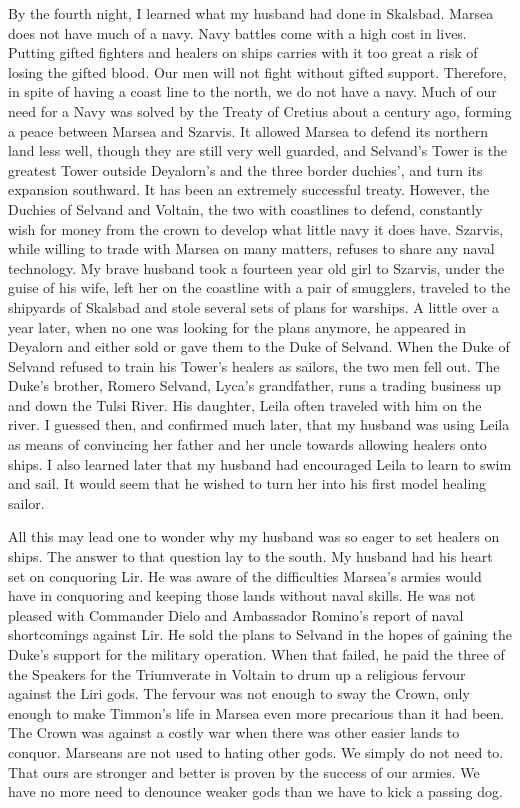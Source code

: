 \documentclass{article}
\begin{document}
By the fourth night, I learned what my husband had done in Skalsbad. Marsea does not have much of a navy. Navy battles come with a high cost in lives. Putting gifted fighters and healers on ships carries with it too great a risk of losing the gifted blood. Our men will not fight without gifted support. Therefore, in spite of having a coast line to the north, we do not have a navy. Much of our need for a Navy was solved by the Treaty of Cretius about a century ago, forming a peace between Marsea and Szarvis. It allowed Marsea to defend its northern land less well, though they are still very well guarded, and Selvand's Tower is the greatest Tower outside Deyalorn's and the three border duchies', and turn its expansion southward. It has been an extremely successful treaty. However, the Duchies of Selvand and Voltain, the two with coastlines to defend, constantly wish for money from the crown to develop what little navy it does have. Szarvis, while willing to trade with Marsea on many matters, refuses to share any naval technology. My brave husband took a fourteen year old girl to Szarvis, under the guise of his wife, left her on the coastline with a pair of smugglers, traveled to the shipyards of Skalsbad and stole several sets of plans for warships. A little over a year later, when no one was looking for the plans anymore, he appeared in Deyalorn and either sold or gave them to the Duke of Selvand. When the Duke of Selvand refused to train his Tower's healers as sailors, the two men fell out. The Duke's brother, Romero Selvand, Lyca's grandfather, runs a trading business up and down the Tulsi River. His daughter, Leila often traveled with him on the river. I guessed then, and confirmed much later, that my husband was using Leila as means of convincing her father and her uncle towards allowing healers onto ships. I also learned later that my husband had encouraged Leila to learn to swim and sail. It would seem that he wished to turn her into his first model healing sailor.

All this may lead one to wonder why my husband was so eager to set healers on ships. The answer to that question lay to the south. My husband had his heart set on conquoring Lir. He was aware of the difficulties Marsea's armies would have in conquoring and keeping those lands without naval skills. He was not pleased with Commander Dielo and Ambassador Romino's report of naval shortcomings against Lir. He sold the plans to Selvand in the hopes of gaining the Duke's support for the military operation. When that failed, he paid the three of the Speakers for the Triumverate in Voltain to drum up a religious fervour against the Liri gods. The fervour was not enough to sway the Crown, only enough to make Timmon's life in Marsea even more precarious than it had been. The Crown was against a costly war when there was other easier lands to conquor. Marseans are not used to hating other gods. We simply do not need to. That ours are stronger and better is proven by the success of our armies. We have no more need to denounce weaker gods than we have to kick a passing dog. 
\end{document}
